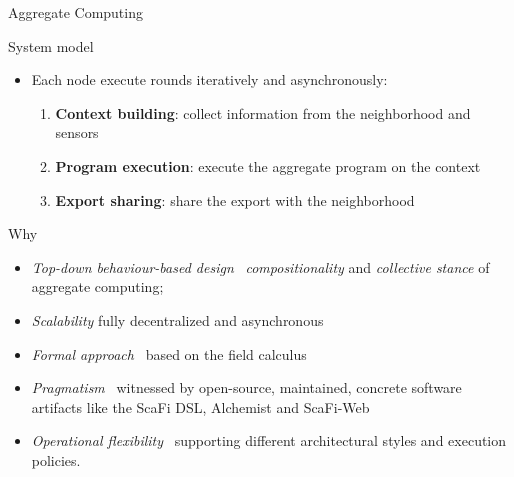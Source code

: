 \documentclass[presentation, 9pt]{beamer}\mode<presentation>{\usetheme{AMSBolognaFC}}
\begin{document}
\begin{frame}[allowframebreaks]{Aggregate Computing}
\begin{alertblock}{System model}
\begin{itemize}
		\item Each node execute rounds iteratively and asynchronously:
		\begin{enumerate}
			\item \textbf{Context building}: collect information from the neighborhood and sensors
			\item \textbf{Program execution}: execute the aggregate program on the context
			\item \textbf{Export sharing}: share the export with the neighborhood
		\end{enumerate}
	\end{itemize}
\end{alertblock}
\begin{block}{Why}
\begin{itemize}
	\item \emph{Top-down behaviour-based design} \faArrowRight \, \emph{compositionality} and \emph{collective stance} of aggregate computing;
	\item \emph{Scalability} \faArrowRight fully decentralized and asynchronous
	\item \emph{Formal approach} \faArrowRight \, based on the field calculus
		
	\item \emph{Pragmatism} \faArrowRight \, witnessed by open-source, maintained, concrete software artifacts like the ScaFi DSL, Alchemist and {\sc{}ScaFi-Web}
	\item \emph{Operational flexibility} \faArrowRight \, supporting different architectural styles and execution policies.
\end{itemize}

\end{block}

\end{frame}
\end{document}
